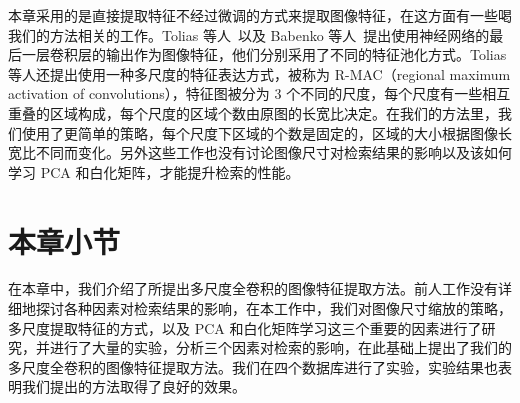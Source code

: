 本章采用的是直接提取特征不经过微调的方式来提取图像特征，在这方面有一些喝我们的方法相关的工作。Tolias 等人~\cite{Tolias2015ParticularOR}以及 Babenko 等人~\cite{Babenko2015AggregatingLD}提出使用神经网络的最后一层卷积层的输出作为图像特征，他们分别采用了不同的特征池化方式。Tolias 等人还提出使用一种多尺度的特征表达方式，被称为 R-MAC（regional maximum activation of convolutions），特征图被分为 3 个不同的尺度，每个尺度有一些相互重叠的区域构成，每个尺度的区域个数由原图的长宽比决定。在我们的方法里，我们使用了更简单的策略，每个尺度下区域的个数是固定的，区域的大小根据图像长宽比不同而变化。另外这些工作也没有讨论图像尺寸对检索结果的影响以及该如何学习 PCA 和白化矩阵，才能提升检索的性能。

\section{本章小节}\label{sec:mfc_conclusion}
在本章中，我们介绍了所提出多尺度全卷积的图像特征提取方法。前人工作没有详细地探讨各种因素对检索结果的影响，在本工作中，我们对图像尺寸缩放的策略，多尺度提取特征的方式，以及 PCA 和白化矩阵学习这三个重要的因素进行了研究，并进行了大量的实验，分析三个因素对检索的影响，在此基础上提出了我们的多尺度全卷积的图像特征提取方法。我们在四个数据库进行了实验，实验结果也表明我们提出的方法取得了良好的效果。
